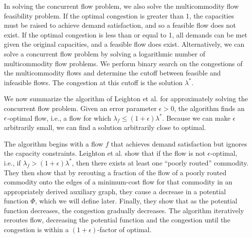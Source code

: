 In solving the concurrent flow problem, we also solve the multicommodity
flow feasibility problem.  If the optimal congestion is greater than 1, 
the capacities must be raised to achieve demand satisfaction, and so a 
feasible flow does not exist.  If the optimal congestion is less than or
equal to 1, all demands can be met given the original capacities, and a
feasible flow does exist.
Alternatively, we can solve a concurrent flow problem 
by solving a logarithmic number of multicommodity flow problems.
We perform binary search on the congestions of the multicommodity flows 
and determine the cutoff between feasible and infeasible flows.
The congestion at this cutoff is the solution $\lambda^*$.

We now summarize the algorithm of Leighton et al. for approximately
solving the concurrent flow problem.  Given an error parameter 
$\epsilon > 0$, the algorithm finds an $\epsilon$-optimal flow, 
i.e., a flow for which $\lambda _f \leq (1 + \epsilon)\lambda ^*$.  
Because we can make $\epsilon$ arbitrarily small, we can find a solution
arbitrarily close to optimal.

The algorithm begins with a flow $f$ that achieves demand satisfaction but
ignores the capacity constraints.  Leighton et al. show that if the
flow is not $\epsilon$-optimal,
i.e., if $\lambda _f > (1 + \epsilon)\lambda ^*$, 
then there exists at least one ``poorly routed'' commodity.
They then show that by rerouting a fraction of the flow of
a poorly routed commodity onto the edges of a minimum-cost flow for
that commodity in an appropriately derived auxiliary graph,
they cause a decrease in a potential function $\Phi$, which we will
define later.
Finally, they show that as the potential function decreases, 
the congestion gradually decreases.
The algorithm iteratively reroutes flow,
decreasing the potential function and the congestion 
until the congestion is within a $(1+\epsilon)$-factor of optimal.

